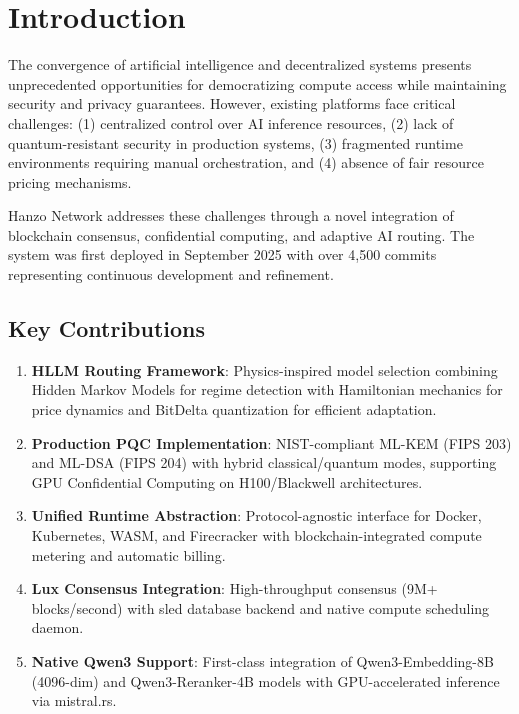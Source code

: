 \section{Introduction}


The convergence of artificial intelligence and decentralized systems presents unprecedented opportunities for democratizing compute access while maintaining security and privacy guarantees. However, existing platforms face critical challenges: (1) centralized control over AI inference resources, (2) lack of quantum-resistant security in production systems, (3) fragmented runtime environments requiring manual orchestration, and (4) absence of fair resource pricing mechanisms.

Hanzo Network addresses these challenges through a novel integration of blockchain consensus, confidential computing, and adaptive AI routing. The system was first deployed in September 2025 with over 4,500 commits representing continuous development and refinement.

\subsection{Key Contributions}

\begin{enumerate}
\item \textbf{HLLM Routing Framework}: Physics-inspired model selection combining Hidden Markov Models for regime detection with Hamiltonian mechanics for price dynamics and BitDelta quantization for efficient adaptation.

\item \textbf{Production PQC Implementation}: NIST-compliant ML-KEM (FIPS 203) and ML-DSA (FIPS 204) with hybrid classical/quantum modes, supporting GPU Confidential Computing on H100/Blackwell architectures.

\item \textbf{Unified Runtime Abstraction}: Protocol-agnostic interface for Docker, Kubernetes, WASM, and Firecracker with blockchain-integrated compute metering and automatic billing.

\item \textbf{Lux Consensus Integration}: High-throughput consensus (9M+ blocks/second) with sled database backend and native compute scheduling daemon.

\item \textbf{Native Qwen3 Support}: First-class integration of Qwen3-Embedding-8B (4096-dim) and Qwen3-Reranker-4B models with GPU-accelerated inference via mistral.rs.
\end{enumerate}


